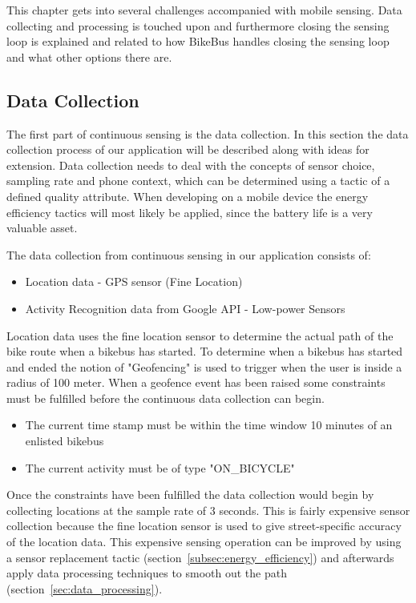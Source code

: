 
This chapter gets into several challenges accompanied with mobile sensing. Data collecting and processing is touched upon and furthermore closing the sensing loop is explained and related to how BikeBus handles closing the sensing loop and what other options there are. 

\subsection{Data Collection}
\label{sec:data_collection}

The first part of continuous sensing is the data collection. In this section the data collection process of our application will be described along with ideas for extension.
Data collection needs to deal with the concepts of sensor choice, sampling rate and phone context, which can be determined using a tactic of a defined quality attribute. When developing on a mobile device the energy efficiency tactics will most likely be applied, since the battery life is a very valuable asset.  

The data collection from continuous sensing in our application consists of: 
\begin{itemize}
    \item Location data - GPS sensor (Fine Location)
    \item Activity Recognition data from Google API - Low-power Sensors \cite{androidActivity}
\end{itemize}

Location data uses the fine location sensor to determine the actual path of the bike route when a bikebus has started. To determine when a bikebus has started and ended the notion of "Geofencing" is used to trigger when the user is inside a radius of 100 meter. 
When a geofence event has been raised some constraints must be fulfilled before the continuous data collection can begin.
\begin{itemize}
    \item The current time stamp must be within the time window 10 minutes of an enlisted bikebus
    \item The current activity must be of type "ON\_BICYCLE"
\end{itemize}
Once the constraints have been fulfilled the data collection would begin by collecting locations at the sample rate of 3 seconds. This is fairly expensive sensor collection because the fine location sensor is used to give street-specific accuracy of the location data. This expensive sensing operation can be improved by using a sensor replacement tactic (section~\ref{subsec:energy_efficiency}) and afterwards apply data processing techniques to smooth out the path (section~\ref{sec:data_processing}).


